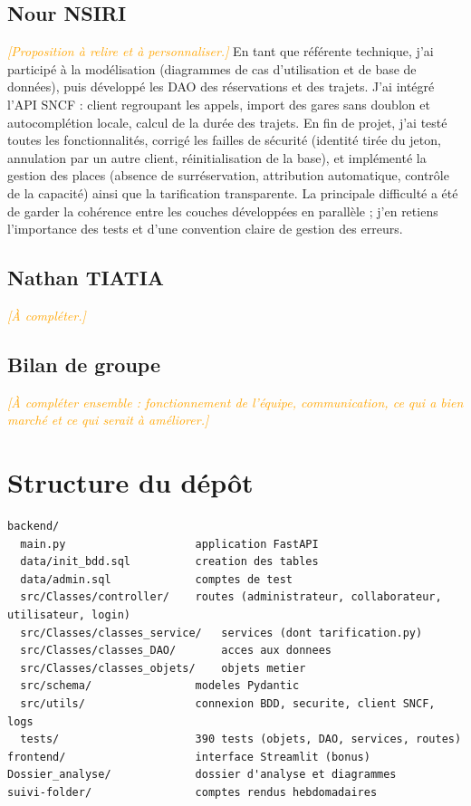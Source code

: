 \documentclass[11pt,a4paper]{article}
\newcommand{\acompleter}[1]{\textcolor{orange}{\textit{[#1]}}}
\begin{document}
\subsection*{Nour NSIRI}
\acompleter{Proposition à relire et à personnaliser.}
En tant que référente technique, j'ai participé à la modélisation (diagrammes de cas d'utilisation
et de base de données), puis développé les DAO des réservations et des trajets. J'ai intégré l'API
SNCF : client regroupant les appels, import des gares sans doublon et autocomplétion locale, calcul
de la durée des trajets. En fin de projet, j'ai testé toutes les fonctionnalités, corrigé les failles
de sécurité (identité tirée du jeton, annulation par un autre client, réinitialisation de la base),
et implémenté la gestion des places (absence de surréservation, attribution automatique, contrôle
de la capacité) ainsi que la tarification transparente. La principale difficulté a été de garder la
cohérence entre les couches développées en parallèle ; j'en retiens l'importance des tests et
d'une convention claire de gestion des erreurs.

\subsection*{Nathan TIATIA}
\acompleter{À compléter.}

\subsection*{Bilan de groupe}
\acompleter{À compléter ensemble : fonctionnement de l'équipe, communication, ce qui a bien marché
et ce qui serait à améliorer.}

\section{Structure du dépôt}

\begin{lstlisting}[language={}]
backend/
  main.py                    application FastAPI
  data/init_bdd.sql          creation des tables
  data/admin.sql             comptes de test
  src/Classes/controller/    routes (administrateur, collaborateur, utilisateur, login)
  src/Classes/classes_service/   services (dont tarification.py)
  src/Classes/classes_DAO/       acces aux donnees
  src/Classes/classes_objets/    objets metier
  src/schema/                modeles Pydantic
  src/utils/                 connexion BDD, securite, client SNCF, logs
  tests/                     390 tests (objets, DAO, services, routes)
frontend/                    interface Streamlit (bonus)
Dossier_analyse/             dossier d'analyse et diagrammes
suivi-folder/                comptes rendus hebdomadaires
\end{lstlisting}
\end{document}
